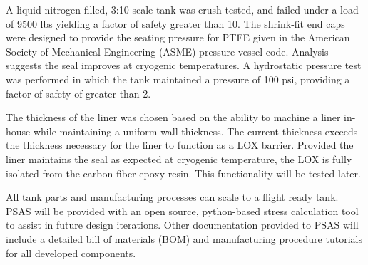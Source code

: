 A liquid nitrogen-filled, 3:10 scale tank was crush tested, and failed under a load of 9500 lbs yielding a factor of safety greater than 10. The shrink-fit end caps were designed to provide the seating pressure for PTFE given in the American Society of Mechanical Engineering (ASME) pressure vessel code. Analysis suggests the seal improves at cryogenic temperatures. A hydrostatic pressure test was performed in which the tank maintained a pressure of 100 psi, providing a factor of safety of greater than 2.

The thickness of the liner was chosen based on the ability to machine a liner in-house while maintaining a uniform wall thickness. The current thickness exceeds the thickness necessary for the liner to function as a LOX barrier. Provided the liner maintains the seal as expected at cryogenic temperature, the LOX is fully isolated from the carbon fiber epoxy resin. This functionality will be tested later. 

All tank parts and manufacturing processes can scale to a flight ready tank. PSAS will be provided with an open source, python-based stress calculation tool to assist in future design iterations. Other documentation provided to PSAS will include a detailed bill of materials (BOM) and manufacturing procedure tutorials for all developed components. 
\newpage
